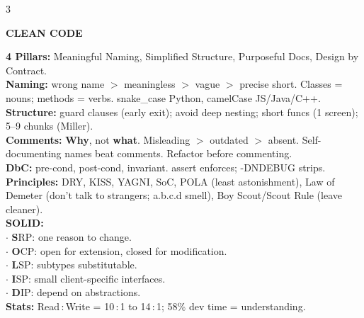 \documentclass[10pt,letterpaper]{article}
\newenvironment{topic}[1]{%
  \par\addvspace{1.5pt}%
  \noindent\colorbox{hdrBG}{%
    \begin{minipage}{\dimexpr\linewidth-2\fboxsep\relax}%
      \centering\bfseries\sffamily\fontsize{6pt}{7pt}\selectfont\color{hdrFG}\MakeUppercase{#1}%
    \end{minipage}%
  }\par\nobreak\vskip0.5pt%
  \begingroup\setlength{\leftskip}{0pt}\setlength{\rightskip}{0pt}%
}{%
  \endgroup\par\addvspace{0.5pt}%
}
\newcommand{\hd}[1]{\textcolor{accent}{\textbf{#1}}}
\newcommand{\cn}[1]{{\ttfamily\small #1}}
\begin{document}
\begin{multicols*}{3}
\begin{topic}{Clean Code}
\hd{4 Pillars:} Meaningful Naming, Simplified Structure, Purposeful Docs, Design by Contract.\\
\hd{Naming:} wrong name $>$ meaningless $>$ vague $>$ precise short. Classes = nouns; methods = verbs. snake\_case Python, camelCase JS/Java/C++.\\
\hd{Structure:} guard clauses (early exit); avoid deep nesting; short funcs (1 screen); 5--9 chunks (Miller).\\
\hd{Comments:} \textbf{Why}, not \textbf{what}. Misleading $>$ outdated $>$ absent. Self-documenting names beat comments. Refactor before commenting.\\
\hd{DbC:} pre-cond, post-cond, invariant. \cn{assert} enforces; \cn{-DNDEBUG} strips.\\
\hd{Principles:} DRY, KISS, YAGNI, SoC, POLA (least astonishment), Law of Demeter (don't talk to strangers; \cn{a.b.c.d} smell), Boy Scout/Scout Rule (leave cleaner).\\
\hd{SOLID:}\\
$\cdot$ \textbf{S}RP: one reason to change.\\
$\cdot$ \textbf{O}CP: open for extension, closed for modification.\\
$\cdot$ \textbf{L}SP: subtypes substitutable.\\
$\cdot$ \textbf{I}SP: small client-specific interfaces.\\
$\cdot$ \textbf{D}IP: depend on abstractions.\\
\hd{Stats:} Read\,:\,Write = 10\,:\,1 to 14\,:\,1; 58\% dev time = understanding.
\end{topic}


\end{multicols*}
\end{document}
